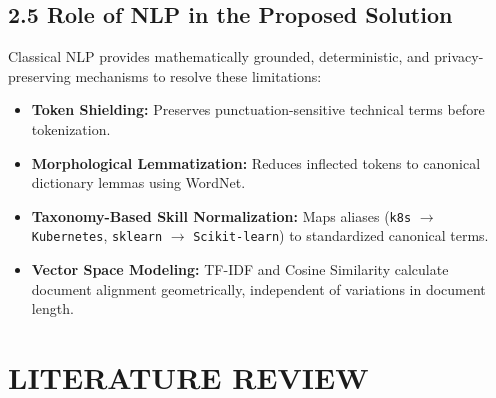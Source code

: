\documentclass[11pt,a4paper]{article}
\begin{document}
\subsection{2.5 Role of NLP in the Proposed Solution}
Classical NLP provides mathematically grounded, deterministic, and privacy-preserving mechanisms to resolve these limitations:
\begin{itemize}[noitemsep]
    \item \textbf{Token Shielding:} Preserves punctuation-sensitive technical terms before tokenization.
    \item \textbf{Morphological Lemmatization:} Reduces inflected tokens to canonical dictionary lemmas using WordNet.
    \item \textbf{Taxonomy-Based Skill Normalization:} Maps aliases (\texttt{k8s} $\to$ \texttt{Kubernetes}, \texttt{sklearn} $\to$ \texttt{Scikit-learn}) to standardized canonical terms.
    \item \textbf{Vector Space Modeling:} TF-IDF and Cosine Similarity calculate document alignment geometrically, independent of variations in document length.
\end{itemize}

\newpage

\section{LITERATURE REVIEW}
\end{document}
